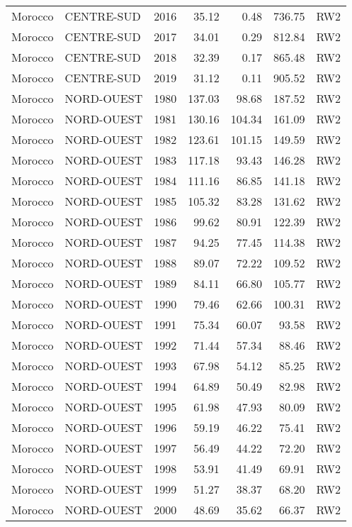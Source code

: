 \begin{longtable}{lllrrrl}
  Morocco & CENTRE-SUD & 2016 & 35.12 & 0.48 & 736.75 & RW2 \\ 
  Morocco & CENTRE-SUD & 2017 & 34.01 & 0.29 & 812.84 & RW2 \\ 
  Morocco & CENTRE-SUD & 2018 & 32.39 & 0.17 & 865.48 & RW2 \\ 
  Morocco & CENTRE-SUD & 2019 & 31.12 & 0.11 & 905.52 & RW2 \\ 
  Morocco & NORD-OUEST & 1980 & 137.03 & 98.68 & 187.52 & RW2 \\ 
  Morocco & NORD-OUEST & 1981 & 130.16 & 104.34 & 161.09 & RW2 \\ 
  Morocco & NORD-OUEST & 1982 & 123.61 & 101.15 & 149.59 & RW2 \\ 
  Morocco & NORD-OUEST & 1983 & 117.18 & 93.43 & 146.28 & RW2 \\ 
  Morocco & NORD-OUEST & 1984 & 111.16 & 86.85 & 141.18 & RW2 \\ 
  Morocco & NORD-OUEST & 1985 & 105.32 & 83.28 & 131.62 & RW2 \\ 
  Morocco & NORD-OUEST & 1986 & 99.62 & 80.91 & 122.39 & RW2 \\ 
  Morocco & NORD-OUEST & 1987 & 94.25 & 77.45 & 114.38 & RW2 \\ 
  Morocco & NORD-OUEST & 1988 & 89.07 & 72.22 & 109.52 & RW2 \\ 
  Morocco & NORD-OUEST & 1989 & 84.11 & 66.80 & 105.77 & RW2 \\ 
  Morocco & NORD-OUEST & 1990 & 79.46 & 62.66 & 100.31 & RW2 \\ 
  Morocco & NORD-OUEST & 1991 & 75.34 & 60.07 & 93.58 & RW2 \\ 
  Morocco & NORD-OUEST & 1992 & 71.44 & 57.34 & 88.46 & RW2 \\ 
  Morocco & NORD-OUEST & 1993 & 67.98 & 54.12 & 85.25 & RW2 \\ 
  Morocco & NORD-OUEST & 1994 & 64.89 & 50.49 & 82.98 & RW2 \\ 
  Morocco & NORD-OUEST & 1995 & 61.98 & 47.93 & 80.09 & RW2 \\ 
  Morocco & NORD-OUEST & 1996 & 59.19 & 46.22 & 75.41 & RW2 \\ 
  Morocco & NORD-OUEST & 1997 & 56.49 & 44.22 & 72.20 & RW2 \\ 
  Morocco & NORD-OUEST & 1998 & 53.91 & 41.49 & 69.91 & RW2 \\ 
  Morocco & NORD-OUEST & 1999 & 51.27 & 38.37 & 68.20 & RW2 \\ 
  Morocco & NORD-OUEST & 2000 & 48.69 & 35.62 & 66.37 & RW2 \\ 

\end{longtable}
